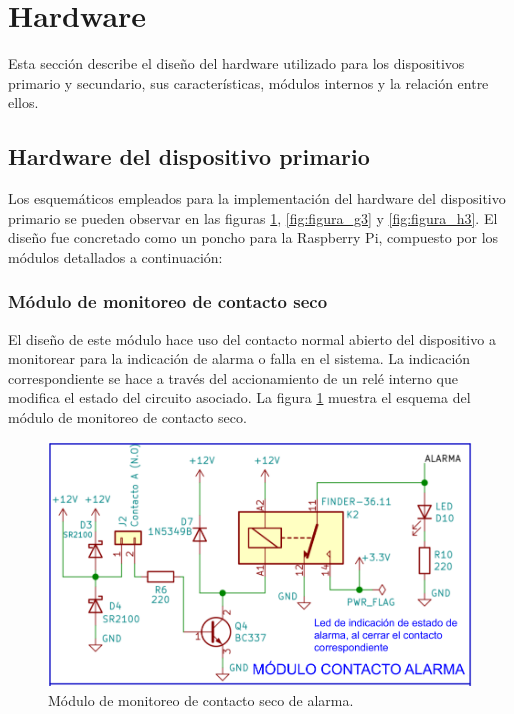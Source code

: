 \newpage

\section{Hardware}

Esta sección describe el  diseño del hardware utilizado para los dispositivos primario y secundario, sus características, módulos internos y la relación entre ellos.

\subsection{Hardware del dispositivo primario}

Los esquemáticos empleados para la implementación del hardware del dispositivo primario se pueden observar en las figuras \ref{fig:figura_f3}, \ref{fig:figura_g3} y \ref{fig:figura_h3}. El diseño fue concretado como un poncho para la Raspberry Pi, compuesto por los módulos detallados a continuación:

\subsubsection{Módulo de monitoreo de contacto seco}

El diseño de este módulo hace uso del contacto normal abierto del dispositivo a monitorear para la indicación de alarma o falla en el sistema. La indicación correspondiente se hace a través del accionamiento de un relé interno que modifica el estado del circuito asociado.
La figura \ref{fig:figura_f3} muestra el esquema del módulo de monitoreo de contacto seco.

\begin{figure}[]
	\centering
	\includegraphics[scale=.35]{./Figures/Capitulo3/Fig_F3.png}
	\caption{Módulo de monitoreo de contacto seco de alarma.}
	\label{fig:figura_f3}
\end{figure} 

